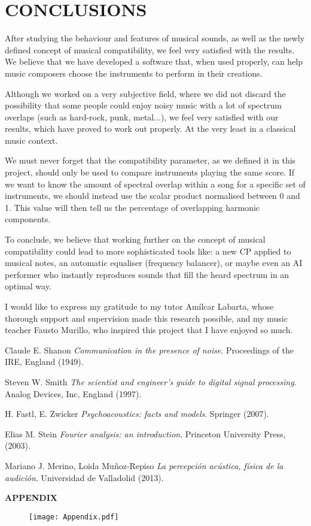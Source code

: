 \documentclass[twocolumn]{revtex4}
\begin{document}

\bigskip

\section{CONCLUSIONS}
After studying the behaviour and features of musical sounds, as well as the newly defined concept of musical compatibility, we feel very satisfied with the results. We believe that we have developed a software that, when used properly, can help music composers choose the instruments to perform in their creations. 

Although we worked on a very subjective field, where we did not discard the possibility that some people could enjoy noisy music with a lot of spectrum overlaps (such as hard-rock, punk, metal...), we feel very satisfied with our results, which have proved to work out properly. At the very least in a classical music context.

We must never forget that the compatibility parameter, as we defined it in this project, should only be used to compare instruments playing the same score. If we want to know the amount of spectral overlap within a song for a specific set of instruments, we should instead use the scalar product normalised between 0 and 1. This value will then tell us the percentage of overlapping harmonic components.

To conclude, we believe that working further on the concept of musical compatibility could lead to more sophisticated tools like: a new CP applied to musical notes, an automatic equaliser (frequency balancer), or maybe even an AI performer who instantly reproduces sounds that fill the heard spectrum in an optimal way.

\begin{acknowledgements}
I would like to express my gratitude to my tutor Amílcar Labarta, whose thorough support and supervision made this research possible, and my music teacher Fausto Murillo, who inspired this project that I have enjoyed so much.

\end{acknowledgements}

\begin{thebibliography}{5}
Claude E. Shanon
\textit{Communication in the presence of noise}. 
Proceedings of the IRE, England (1949).

Steven W. Smith
\textit{The scientist and engineer's guide to digital signal processing}. 
Analog Devices, Inc, England (1997).

H. Fastl, E. Zwicker
\textit{Psychoacoustics: facts and models}. 
Springer (2007).

Elias M. Stein 
\textit{Fourier analysis: an introduction}. 
Princeton University Press,  (2003).

Mariano J. Merino, Loida Muñoz-Repiso
\textit{La percepción acústica, física de la audición}. 
Universidad de Valladolid (2013).

\end{thebibliography}
\newpage



{\huge \textbf{APPENDIX}}

\begin{figure}[h!]
\centering
\texttt{[image: Appendix.pdf]}

\end{figure}
\end{document}
